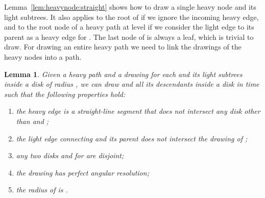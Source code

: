 \documentclass[11pt]{article}
\newtheorem{lemma}{Lemma}
\begin{document}
Lemma~\ref{lem:heavynode:straight} shows how to draw a single heavy
node  and its light subtrees. It also applies to the root of  if
we ignore the incoming heavy edge, and to the root node  of a
heavy path  at level  if we consider
the light edge  to its parent  as a heavy edge for . The last node  of  is always a leaf, which is trivial
to draw. For drawing an entire heavy path  we
need to link the drawings of the heavy nodes into a path.

\begin{lemma}\label{lem:heavypath:straight}
  Given a heavy path  and a drawing for each
   and its light subtrees inside a disk  of radius , we
  can draw  and all its descendants inside a disk  in  time such that the
  following properties hold:
  \begin{enumerate}
  \item\label{dsle:item:hp:edges} the heavy edge  is a
    straight-line segment that does not intersect any disk other than
     and ;
  \item\label{dsle:item:hp:light} the light edge connecting  and its
    parent does not intersect the drawing of ;
  \item\label{dsle:item:hp:disjoint} any two disks  and  for
     are disjoint;
  \item\label{dsle:item:hp:angres} the drawing has perfect angular
    resolution;
  \item\label{dsle:item:hp:area} the radius  of  is .
  \end{enumerate}
\end{lemma}
\end{document}
